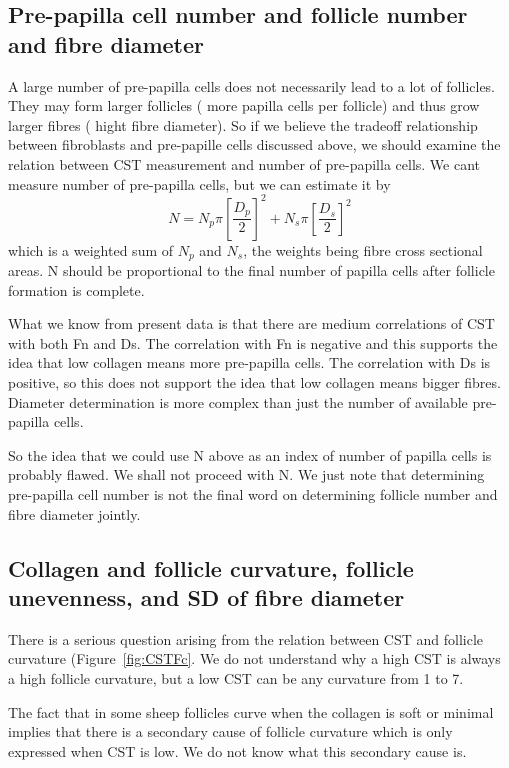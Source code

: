 \documentclass[titlepage]{article}  %
\begin{document}
\subsection{Pre-papilla cell number and follicle number and fibre diameter}
A large number of pre-papilla cells does not necessarily lead to a lot of follicles. They may form larger follicles ( more papilla cells per follicle) and thus grow larger fibres ( hight fibre diameter).
So if we believe the tradeoff relationship between fibroblasts and pre-papille cells discussed above, we should examine the relation between CST measurement  and number of pre-papilla cells. We cant measure number of pre-papilla cells, but we can estimate it by
\begin{displaymath}
N = N_{p} \pi \left[\frac{D_{p}}{2}\right]^2 + N_{s} \pi \left[\frac{D_{s}}{2}\right]^2
\end{displaymath}
which is a weighted sum of $N_{p}$ and $N_{s}$, the weights being fibre cross sectional areas. N should be proportional to the final number of papilla cells after follicle formation is complete.

What we know from present data is that there are medium correlations of CST with both Fn and Ds. The correlation with Fn is negative and this supports the idea that low collagen means more pre-papilla cells. The correlation with Ds is positive, so this does not support the idea that low collagen means bigger fibres. Diameter determination is more complex than just the number of available pre-papilla cells. 

So the idea that we could use N above as an index of number of papilla cells is probably flawed. We shall not proceed with N. We just note that determining pre-papilla cell number is not the final word on determining follicle number and fibre diameter jointly.

\subsection{Collagen and follicle curvature, follicle unevenness, and SD of fibre diameter}
There is a serious  question arising from the relation between CST and follicle curvature (Figure~\ref{fig:CSTFc}. We do not understand why a high CST is always a high follicle curvature, but a low CST can be any curvature from 1 to 7. 

The fact that in some sheep follicles curve when the collagen is soft or minimal implies that there is a secondary cause of follicle curvature which is only expressed when CST is low. We do not know what this secondary cause is. 
\end{document}
